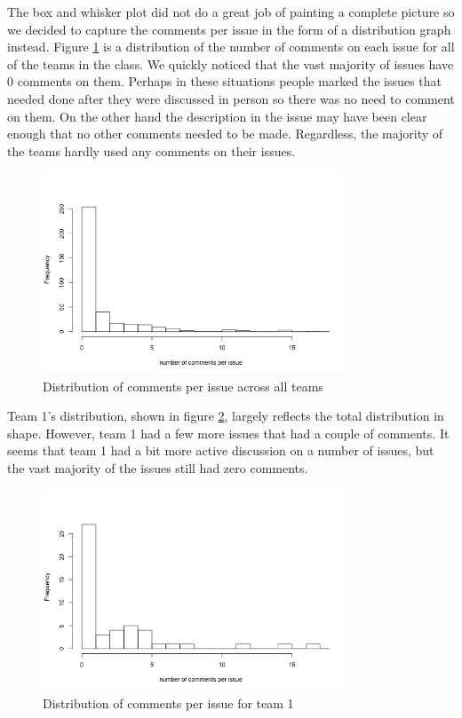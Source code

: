 \documentclass[conference]{IEEEtran}
\begin{document}
The box and whisker plot did not do a great job of painting a complete picture so we decided to capture the comments per issue in the form of a distribution graph instead. Figure \ref{comments_issue_total} is a distribution of the number of comments on each issue for all of the teams in the class. We quickly noticed that the vast majority of issues have 0 comments on them. Perhaps in these situations people marked the issues that needed done after they were discussed in person so there was no need to comment on them. On the other hand the description in the issue may have been clear enough that no other comments needed to be made. Regardless, the majority of the teams hardly used any comments on their issues. 

\begin{figure}[H]
    \centering
    \includegraphics[width=9cm]{../AprilProject/pic/distribution/comment_per_issue_distribution_total.png}
    \caption{Distribution of comments per issue across all teams}
    \label{comments_issue_total}
\end{figure}

Team 1's distribution, shown in figure \ref{comments_issue_team1}, largely reflects the total distribution in shape. However, team 1 had a few more issues that had a couple of comments. It seems that team 1 had a bit more active discussion on a number of issues, but the vast majority of the issues still had zero comments.

\begin{figure}[H]
    \centering
    \includegraphics[width=9cm]{../AprilProject/pic/distribution/comment_per_issue_distribution_team1.png}
    \caption{Distribution of comments per issue for team 1}
    \label{comments_issue_team1}
\end{figure}
\end{document}
